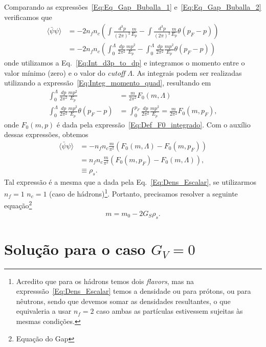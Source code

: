 Comparando as expressões~\eqref{Eq:Eq_Gap_Buballa_1} e~\eqref{Eq:Eq_Gap_Buballa_2} verificamos que
\begin{align}
	\langle\bar{\psi}\psi\rangle &= - 2 n_f n_c \left(\int\frac{d^3p}{(2\pi)^3}\frac{m}{E_p} - \int\frac{d^3p}{(2\pi)^3} \frac{m}{E_p} \theta(p_F - p)\right) \\
	&= - 2 n_f n_c \left(\int_0^\Lambda\frac{dp}{2\pi^2} \frac{mp^2}{E_p} - \int_0^\Lambda \frac{dp}{2\pi^2} \frac{mp^2}{E_p} \theta(p_F - p)\right)
\end{align}
%
onde utilizamos a Eq.~\ref{Eq:Int_d3p_to_dp} e integramos o momento entre o valor mínimo (zero) e o valor do \emph{cutoff} $\Lambda$. As integrais podem ser realizadas utilizando a expressão~\eqref{Eq:Integ_momento_quad}, resultando em
\begin{align}
	\int_0^\Lambda \frac{dp}{2\pi^2} \frac{mp^2}{E_p} &= \frac{m}{2\pi^2} F_0(m,\Lambda)\\
	\int_0^\Lambda \frac{dp}{2\pi^2} \frac{mp^2}{E_p} \theta(p_F - p) &= \int_0^{p_F} \frac{dp}{2\pi^2} \frac{mp^2}{E_p} = \frac{m}{2\pi^2} F_0(m,p_F),
\end{align}
%
onde $F_0(m, p)$ é dada pela expressão~\eqref{Eq:Def_F0_integrado}. Com o auxílio dessas expressões, obtemos
\begin{align}
	\langle\bar{\psi}\psi\rangle &= - n_f n_c \frac{m}{\pi^2} (F_0(m,\Lambda) - F_0(m, p_F)) \label{Eq:Dens_Escalar_NJL_Gv_0}\\
	&= n_f n_c \frac{m}{\pi^2} (F_0(m,p_F) - F_0(m, \Lambda)), \\
	&\equiv \rho_s.
\end{align}
%
Tal expressão é a mesma que a dada pela Eq.~\eqref{Eq:Dens_Escalar}, se utilizarmos $n_f = 1$ $n_c = 1$ (caso de hádrons)\footnote{Acredito que para os hádrons temos dois \emph{flavors}, mas na expresssão~\eqref{Eq:Dens_Escalar} temos a densidade ou para prótons, ou para nêutrons, sendo que devemos somar as densidades resultantes, o que equivaleria a usar $n_f = 2$ caso ambas as partículas estivessem sujeitas às mesmas condições.}. Portanto, precisamos resolver a seguinte equação\footnote{Equação do Gap}
\begin{equation}\label{Eq:Eq_Gap_NJL}
m = m_0 - 2 G_S\rho_s.
\end{equation}

\section{Solução para o caso $G_V = 0$}

